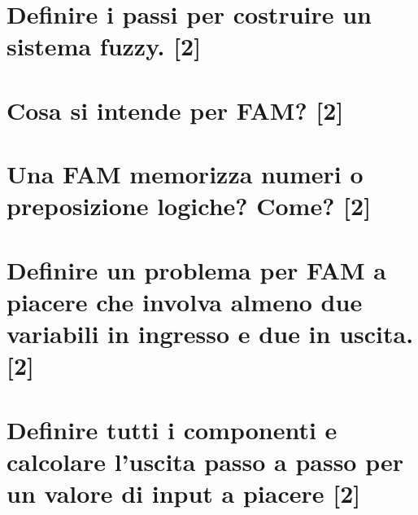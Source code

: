 \documentclass[\main/main.tex]{subfiles}
\begin{document}
\section{Definire i passi per costruire un sistema fuzzy. [2]}
\section{Cosa si intende per FAM? [2]}
\section{Una FAM memorizza numeri o preposizione logiche? Come? [2]}
\section{Definire un problema per FAM a piacere che involva almeno due variabili in ingresso e due in uscita. [2]}
\section{Definire tutti i componenti e calcolare l'uscita passo a passo per un valore di input a piacere [2]}
\end{document}
